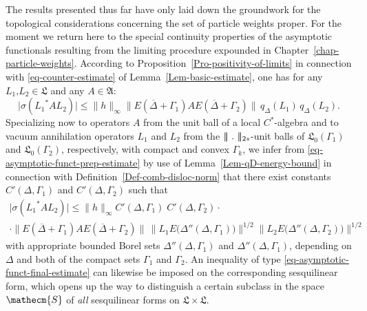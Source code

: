 \documentclass[11pt,twoside,openright]{report}
\theoremstyle{definition}
\theoremstyle{plain}
\theoremstyle{remark}
\theoremstyle{assumption}
\newcommand{\babs}[1]{\bigl\lvert #1 \bigr\rvert}
\newcommand{\norm}[1]{\lVert #1 \rVert}
\newcommand{\bnorm}[1]{\bigl\lVert #1 \bigr\rVert}
\newcommand{\Norm}[1]{\lvert \negthinspace \lvert \negthinspace \lvert
  #1 \rvert \negthinspace \rvert \negthinspace \rvert}
\newcommand{\qDx}[1]{q_\Delta ( #1 )}
\newcommand{\Secm}{\mathecm{S}}
\newcommand{\Afrak}{\mathfrak{A}}
\newcommand{\Lfrak}{\mathfrak{L}}
\newcommand{\EDdGone}{E \bigl( \Delta'' ( \Delta , \Gamma_1 ) \bigr)}
\newcommand{\EDdGtwo}{E \bigl( \Delta'' ( \Delta , \Gamma_2 ) \bigr)}
\newcommand{\EDGoneplus}{E ( \overline{\Delta} + \Gamma_1)}
\newcommand{\EDGtwoplus}{E ( \overline{\Delta} + \Gamma_2)}
\begin{document}
The results presented thus far have only laid down the groundwork for
the topological considerations concerning the set of particle weights
proper. For the moment we return here to the special continuity
properties of the asymptotic functionals resulting from the limiting
procedure expounded in Chapter~\ref{chap-particle-weights}. According
to Proposition~\ref{Pro-positivity-of-limits} in connection with
\eqref{eq-counter-estimate} of Lemma~\ref{Lem-basic-estimate}, one has
for any $L_1 \text{,} L_2 \in \Lfrak$ and any $A \in \Afrak$:
\begin{equation}
  \label{eq-asymptotic-funct-prep-estimate}
  \babs{\sigma ( {L_1}^* A L_2 )} \leqslant \norm{h}_\infty
  \bnorm{\EDGoneplus A \EDGtwoplus} \, \qDx{L_1} \, \qDx{L_2} \text{.}
\end{equation}
Specializing now to operators $A$ from the unit ball of a local
$C^*$-algebra and to vacuum annihilation operators $L_1$ and $L_2$
from the $\Norm{~.~}_{2 s}$-unit balls of $\Lfrak_0 ( \Gamma_1 )$ and
$\Lfrak_0 ( \Gamma_2 )$, respectively, with compact and convex
$\Gamma_k$, we infer from \eqref{eq-asymptotic-funct-prep-estimate} by
use of Lemma~\ref{Lem-qD-energy-bound} in connection with
Definition~\ref{Def-comb-disloc-norm} that there exist constants $C' (
\Delta , \Gamma_1 )$ and $C' ( \Delta , \Gamma_2 )$ such that
\begin{multline}
  \label{eq-asymptotic-funct-final-estimate}
  \babs{\sigma ( {L_1}^* A L_2 )} \leqslant \norm{h}_\infty C'
  ( \Delta , \Gamma_1 ) \; C' ( \Delta , \Gamma_2 ) \cdot \\
  \cdot \bnorm{\EDGoneplus A \EDGtwoplus} \, \bnorm{L_1 \EDdGone}^{1 /
  2} \bnorm{L_2 \EDdGtwo}^{1 / 2}
\end{multline}
with appropriate bounded Borel sets $\Delta'' ( \Delta , \Gamma_1 )$
and $\Delta'' ( \Delta , \Gamma_1 )$, depending on $\Delta$ and both
of the compact sets $\Gamma_1$ and $\Gamma_2$. An inequality of type
\eqref{eq-asymptotic-funct-final-estimate} can likewise be imposed on
the corresponding sesquilinear form, which opens up the way to
distinguish a certain subclass in the space $\Secm$ of \emph{all}
sesquilinear forms on $\Lfrak \times \Lfrak$.
\end{document}
